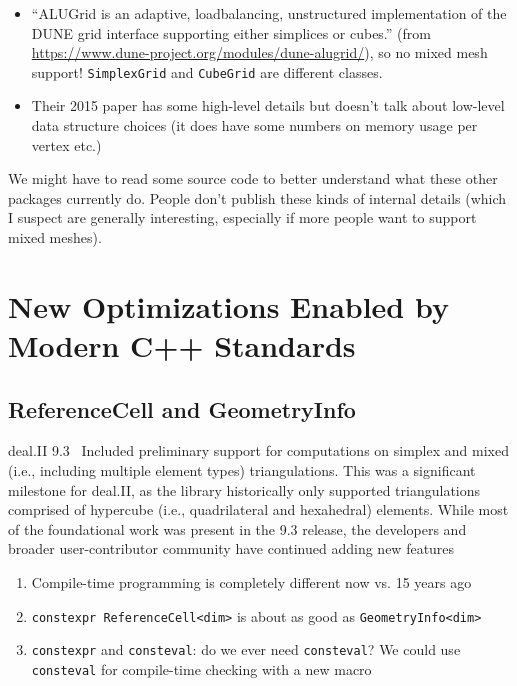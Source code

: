 \documentclass[11pt]{article}
\begin{document}
\begin{itemize}
    \begin{itemize}
      \item ``ALUGrid is an adaptive, loadbalancing, unstructured implementation
        of the DUNE grid interface supporting either simplices or cubes.'' (from
        \url{https://www.dune-project.org/modules/dune-alugrid/}), so no mixed
        mesh support! \texttt{SimplexGrid} and \texttt{CubeGrid} are different
        classes.

      \item Their 2015 paper has some high-level details but doesn't talk about
        low-level data structure choices (it does have some numbers on memory
        usage per vertex etc.)
    \end{itemize}
\end{itemize}

We might have to read some source code to better understand what these other
packages currently do. People don't publish these kinds of internal details
(which I suspect are generally interesting, especially if more people want to
support mixed meshes).

\section{New Optimizations Enabled by Modern C++ Standards}
\label{sec:new-optimizations}

\subsection{ReferenceCell and GeometryInfo}
deal.II 9.3~\cite{dealII93} Included preliminary support for computations on
simplex and mixed (i.e., including multiple element types) triangulations. This
was a significant milestone for deal.II, as the library historically only
supported triangulations comprised of hypercube (i.e., quadrilateral and
hexahedral) elements. While most of the foundational work was present in the 9.3
release, the developers and broader user-contributor community have continued
adding new features

\begin{enumerate}
  \item Compile-time programming is completely different now vs. 15 years ago

  \item \texttt{constexpr ReferenceCell<dim>} is about as good as
    \texttt{GeometryInfo<dim>}

  \item \texttt{constexpr} and \texttt{consteval}: do we ever need
    \texttt{consteval}? We could use \texttt{consteval} for compile-time
    checking with a new macro
\end{enumerate}
\end{document}

